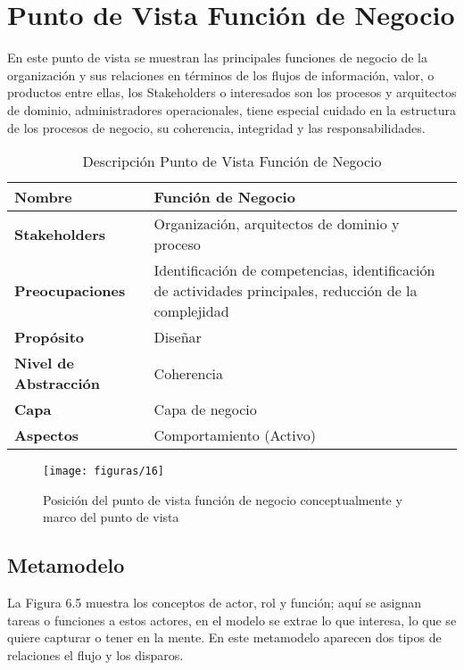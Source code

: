   \section{Punto de Vista Función de Negocio}
  En este punto de vista se muestran las principales funciones de negocio de la organización y sus relaciones en términos de los flujos de información, valor, o productos entre ellas, los Stakeholders o interesados son los procesos y arquitectos de dominio, administradores operacionales, tiene especial cuidado en la estructura de los procesos de negocio, su coherencia, integridad y las responsabilidades.

  \begin{table}[H]
  	\centering
  	\begin{tabular}{p{3.7cm}p{8cm}}
  		\hline
  		\rowcolor[HTML]{0073a1}
  		{\color[HTML]{FFFFFF} \textbf{Nombre}} & {\color[HTML]{FFFFFF} \textbf{Función de Negocio}} \\
  		\hline
  		\textbf{Stakeholders} & Organización, arquitectos de dominio y proceso \\
  		\textbf{Preocupaciones} & Identificación de competencias, identificación de actividades principales, reducción de la complejidad \\
  		\textbf{Propósito} & Diseñar \\
  		\textbf{Nivel de Abstracción} & Coherencia \\
  		\textbf{Capa} & Capa de negocio \\
  		\textbf{Aspectos} & Comportamiento (Activo) \\
  		\bottomrule
  	\end{tabular}
   	\captionsetup{width=.95\textwidth}
   	\caption{Descripción Punto de Vista Función de Negocio}
   	\label{Tab:tabla6}
  \end{table}

  \begin{figure}[H]
   	\centering
   	\texttt{[image: figuras/16]}
   	\captionsetup{width=.95\textwidth}
   	\caption{Posición del punto de vista función de negocio conceptualmente y marco del punto de vista}
   	\label{figura16}
   \end{figure}
    
   \subsection{Metamodelo}
   La Figura 6.5 muestra los conceptos de actor, rol y función; aquí se asignan tareas o funciones a estos actores, en el modelo se extrae lo que interesa, lo que se quiere capturar o tener en la mente. En este metamodelo aparecen dos tipos de relaciones el flujo y los disparos.
    
